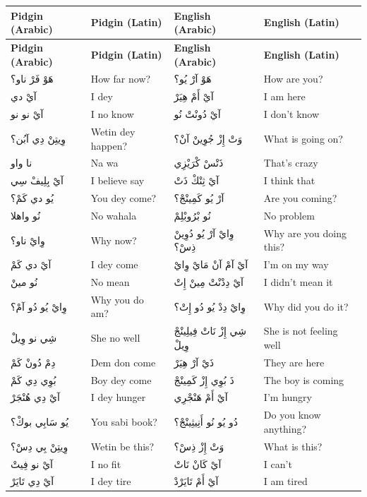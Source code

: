 \documentclass[12pt]{article}
\newcommand{\AR}[1]{\foreignlanguage{arabic}{#1}}
\begin{document}
\begin{longtable}{p{3.2cm} p{3.2cm} p{3.2cm} p{3.2cm}}
\textbf{Pidgin (Arabic)} & \textbf{Pidgin (Latin)} & \textbf{English (Arabic)} & \textbf{English (Latin)} \\ \hline
\endfirsthead
\textbf{Pidgin (Arabic)} & \textbf{Pidgin (Latin)} & \textbf{English (Arabic)} & \textbf{English (Latin)} \\ \hline
\endhead

\AR{هَوْ} \AR{فَرْ} \AR{ناو؟} & How far now? & \AR{هَوْ} \AR{آرْ} \AR{يُو؟} & How are you? \\
\AR{آيْ} \AR{دي} & I dey & \AR{آيْ} \AR{أَمْ} \AR{هِيَرْ} & I am here \\
\AR{آيْ} \AR{نو} \AR{نو} & I no know & \AR{آيْ} \AR{دُونْتْ} \AR{نُو} & I don't know \\
\AR{وِيتِنْ} \AR{دِي} \AR{آبُن؟} & Wetin dey happen? & \AR{وَتْ} \AR{إِزْ} \AR{جُوِينْ} \AR{آنْ؟} & What is going on? \\
\AR{نا} \AR{واو} & Na wa & \AR{ذَتْسْ} \AR{كْرَيْزِي} & That’s crazy \\
\AR{آيْ} \AR{بِلِيفْ} \AR{سِي} & I believe say & \AR{آيْ} \AR{ثِنْكْ} \AR{ذَتْ} & I think that \\
\AR{يُو} \AR{دي} \AR{كَمْ؟} & You dey come? & \AR{آرْ} \AR{يُو} \AR{كَمِينْجْ؟} & Are you coming? \\
\AR{نُو} \AR{واهلا} & No wahala & \AR{نُو} \AR{بْرُوبْلِمْ} & No problem \\
\AR{وِايْ} \AR{ناو؟} & Why now? & \AR{وِايْ} \AR{آرْ} \AR{يُو} \AR{دُوِينْ} \AR{ذِسْ؟} & Why are you doing this? \\
\AR{آيْ} \AR{دي} \AR{كَمْ} & I dey come & \AR{آيْ} \AR{آمْ} \AR{آنْ} \AR{مَايْ} \AR{وِايْ} & I’m on my way \\
\AR{نُو} \AR{مينْ} & No mean & \AR{آيْ} \AR{دِدْنْتْ} \AR{مِينْ} \AR{إِتْ} & I didn’t mean it \\
\AR{وِايْ} \AR{يُو} \AR{دُو} \AR{آمْ؟} & Why you do am? & \AR{وِايْ} \AR{دِدْ} \AR{يُو} \AR{دُو} \AR{إِتْ؟} & Why did you do it? \\
\AR{شِي} \AR{نو} \AR{وِيلْ} & She no well & \AR{شِي} \AR{إِزْ} \AR{نَاتْ} \AR{فِيلِينْجْ} \AR{وِيلْ} & She is not feeling well \\
\AR{دِمْ} \AR{دُونْ} \AR{كَمْ} & Dem don come & \AR{ذَيْ} \AR{آرْ} \AR{هِيَرْ} & They are here \\
\AR{بُوِي} \AR{دِي} \AR{كَمْ} & Boy dey come & \AR{ذَ} \AR{بُوِي} \AR{إِزْ} \AR{كَمِينْجْ} & The boy is coming \\
\AR{آيْ} \AR{دِي} \AR{هُنْجَرْ} & I dey hunger & \AR{آيْ} \AR{أَمْ} \AR{هَنْجْرِي} & I’m hungry \\
\AR{يُو} \AR{سَابِي} \AR{بوكْ؟} & You sabi book? & \AR{دُو} \AR{يُو} \AR{نُو} \AR{أَنِيثِينْجْ؟} & Do you know anything? \\
\AR{وِيتِنْ} \AR{بِي} \AR{دِسْ؟} & Wetin be this? & \AR{وَتْ} \AR{إِزْ} \AR{ذِسْ؟} & What is this? \\
\AR{آيْ} \AR{نو} \AR{فِيتْ} & I no fit & \AR{آيْ} \AR{كَانْ} \AR{نَاتْ} & I can’t \\
\AR{آيْ} \AR{دِي} \AR{تَايَرْ} & I dey tire & \AR{آيْ} \AR{أَمْ} \AR{تَايَرْدْ} & I am tired \\


\end{longtable}
\end{document}
